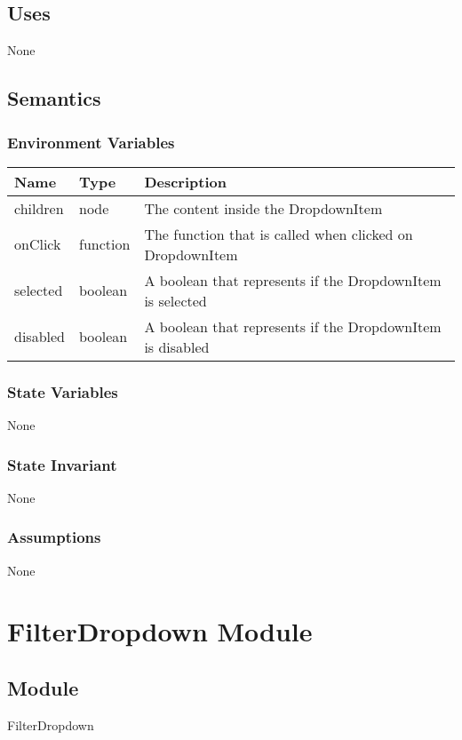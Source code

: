 \documentclass[12pt]{article}
\begin{document}
\subsection{Uses}
None

\subsection{Semantics}

\subsubsection{Environment Variables}
\begin{tabular}{| l | l | p{10cm} |}
    \hline
    \textbf{Name} & \textbf{Type} & \textbf{Description}\\ \hline
    children & node & The content inside the DropdownItem\\ \hline
    onClick & function & The function that is called when clicked on DropdownItem\\ \hline
    selected & boolean & A boolean that represents if the DropdownItem is selected\\ \hline
    disabled & boolean & A boolean that represents if the DropdownItem is disabled\\ \hline
\end{tabular}

\subsubsection{State Variables}
None
\subsubsection{State Invariant}
None

\subsubsection{Assumptions}
None

\newpage


\section{FilterDropdown Module}

\subsection{Module}
FilterDropdown
\end{document}
